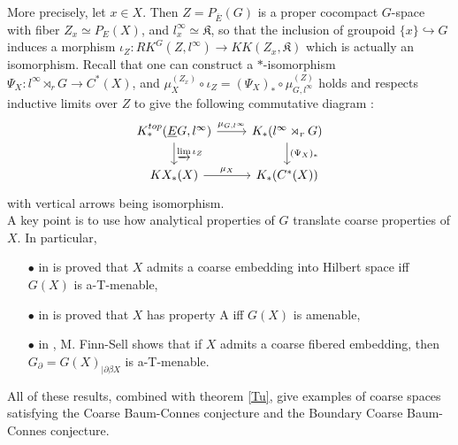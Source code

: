 More precisely, let $x\in X$. Then $Z=P_{\overline E}(G)$ is a proper cocompact $G$-space with fiber $Z_x\simeq P_E(X)$, and $l^\infty_x \simeq \mathfrak K$, so that the inclusion of groupoid $\{x\}\hookrightarrow G $ induces a morphism $\iota_Z : RK^G(Z,l^\infty)\rightarrow KK(Z_x,\mathfrak K)$ which is actually an isomorphism. Recall that one can construct a $*$-isomorphism $\Psi_X: l^\infty \rtimes_r G\rightarrow C^*(X)$, and $\mu_X^{(Z_x)}\circ \iota_Z = (\Psi_X)_*\circ \mu_{G,l^\infty}^{(Z)}$ holds and respects inductive limits over $Z$ to give the following commutative diagram :
\[\begin{tikzcd}
K_*^{top}(\underline E G, l^\infty) \arrow{r}{\mu_{G,l^\infty}}\arrow{d}{\varinjlim \iota_Z} & K_*(l^\infty\rtimes_r G)\arrow{d}{(\Psi_X)_*} \\
KX_*(X)\arrow{r}{\mu_X} & K_*(C^*(X))
\end{tikzcd}\]  
with vertical arrows being isomorphism.\\

A key point is to use how analytical properties of $G$ translate coarse properties of $X$. In particular, 
\begin{itemize}
\item[$\bullet$] in \cite{SkTuYu} is proved that $X$ admits a coarse embedding into Hilbert space iff $G(X)$ is a-T-menable, 
\item[$\bullet$] in \cite{SkTuYu} is proved that $X$ has property A iff $G(X)$ is amenable, 
\item[$\bullet$] in \cite{FinnSellFibred}, M. Finn-Sell shows that if $X$ admits a coarse fibered embedding, then $G_\partial = G(X)_{|\partial \beta X}$ is a-T-menable. 
\end{itemize}
All of these results, combined with theorem \ref{Tu}, give examples of coarse spaces satisfying the Coarse Baum-Connes conjecture and the Boundary Coarse Baum-Connes conjecture.
















